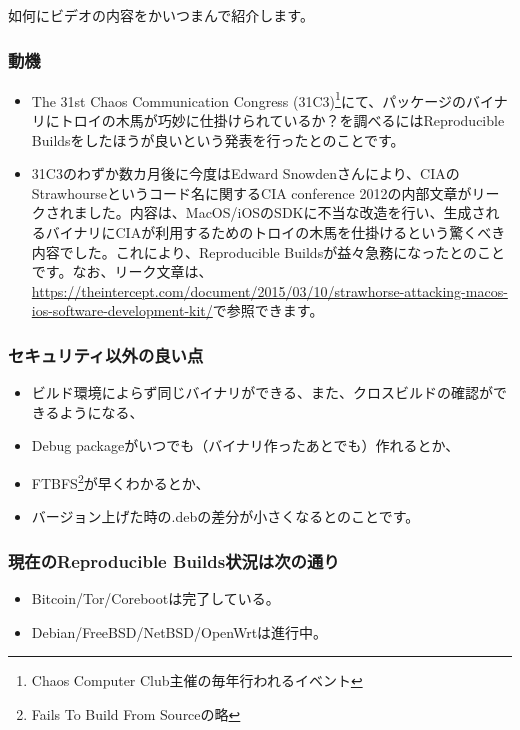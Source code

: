 \documentclass[mingoth,a4paper]{jsarticle}
\begin{document}
如何にビデオの内容をかいつまんで紹介します。

\subsubsection{動機}

 \begin{itemize}
 \item The 31st Chaos Communication Congress (31C3)\footnote{Chaos Computer Club主催の毎年行われるイベント}にて、パッケージのバイナリにトロイの木馬が巧妙に仕掛けられているか？を調べるにはReproducible Buildsをしたほうが良いという発表を行ったとのことです。
\item 31C3のわずか数カ月後に今度はEdward Snowdenさんにより、CIAのStrawhourseというコード名に関するCIA conference 2012の内部文章がリークされました。内容は、MacOS/iOSのSDKに不当な改造を行い、生成されるバイナリにCIAが利用するためのトロイの木馬を仕掛けるという驚くべき内容でした。これにより、Reproducible Buildsが益々急務になったとのことです。なお、リーク文章は、\url{https://theintercept.com/document/2015/03/10/strawhorse-attacking-macos-ios-software-development-kit/}で参照できます。
 \end{itemize}

\subsubsection{セキュリティ以外の良い点}

\begin{itemize}
 \item ビルド環境によらず同じバイナリができる、また、クロスビルドの確認ができるようになる、
 \item Debug packageがいつでも（バイナリ作ったあとでも）作れるとか、
 \item FTBFS\footnote{Fails To Build From Sourceの略}が早くわかるとか、
 \item バージョン上げた時の.debの差分が小さくなるとのことです。
 \end{itemize}

\subsubsection{現在のReproducible Builds状況は次の通り}

 \begin{itemize}
 \item Bitcoin/Tor/Corebootは完了している。
 \item Debian/FreeBSD/NetBSD/OpenWrtは進行中。
 \end{itemize}
\end{document}
